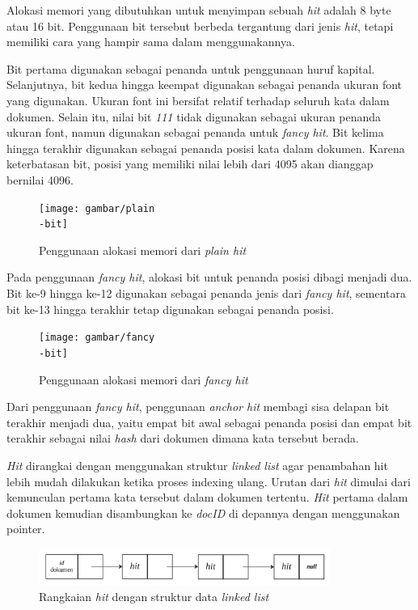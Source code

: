 Alokasi memori yang dibutuhkan untuk menyimpan sebuah \emph{hit} adalah 8 byte
atau 16 bit. Penggunaan bit tersebut berbeda tergantung dari jenis \emph{hit},
tetapi memiliki cara yang hampir sama dalam menggunakannya. 

Bit pertama digunakan sebagai penanda untuk penggunaan huruf kapital.
Selanjutnya, bit kedua hingga keempat digunakan sebagai penanda ukuran font yang
digunakan. Ukuran font ini bersifat relatif terhadap seluruh kata dalam dokumen.
Selain itu, nilai bit \emph{111} tidak digunakan sebagai ukuran penanda ukuran
font, namun digunakan sebagai penanda untuk \emph{fancy hit}. Bit kelima hingga
terakhir digunakan sebagai penanda posisi kata dalam dokumen. Karena
keterbatasan bit, posisi yang memiliki nilai lebih dari 4095 akan dianggap
bernilai 4096.

\begin{figure}[H]
  \centering{}
	\texttt{[image: gambar/plain\\-bit]}
  \caption{Penggunaan alokasi memori dari \emph{plain hit}}
\end{figure}

Pada penggunaan \emph{fancy hit}, alokasi bit untuk penanda posisi dibagi
menjadi dua. Bit ke-9 hingga ke-12 digunakan sebagai penanda jenis dari
\emph{fancy hit}, sementara bit ke-13 hingga terakhir tetap digunakan sebagai
penanda posisi.

\begin{figure}[H]
  \centering{}
	\texttt{[image: gambar/fancy\\-bit]}
  \caption{Penggunaan alokasi memori dari \emph{fancy hit}}
\end{figure}

Dari penggunaan \emph{fancy hit}, penggunaan \emph{anchor hit} membagi sisa
delapan bit terakhir menjadi dua, yaitu empat bit awal sebagai penanda posisi
dan empat bit terakhir sebagai nilai \emph{hash} dari dokumen dimana kata
tersebut berada.

\emph{Hit} dirangkai dengan menggunakan struktur \emph{linked list} agar
penambahan hit lebih mudah dilakukan ketika proses indexing ulang. Urutan dari
\emph{hit} dimulai dari kemunculan pertama kata tersebut dalam dokumen tertentu.
\emph{Hit} pertama dalam dokumen kemudian disambungkan ke \textit{docID} di
depannya dengan menggunakan pointer.

\begin{figure}[H]
  \centering{}
	\includegraphics[width=0.85\textwidth]{gambar/linkedListHit}
  \caption{Rangkaian \emph{hit} dengan struktur data \emph{linked list}}
\end{figure}

